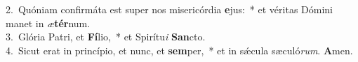 {2.~}Quóniam confirmáta est super nos misericórdia \textbf{e}jus:~* et véritas Dómini manet in \textit{æ}\textbf{tér}num.\\
{3.~}Glória Patri, et \textbf{Fí}lio,~* et Spirítu\textit{i} \textbf{San}cto.\\
{4.~}Sicut erat in princípio, et nunc, et \textbf{sem}per,~* et in sǽcula sæculó\textit{rum}. \textbf{A}men.\\
